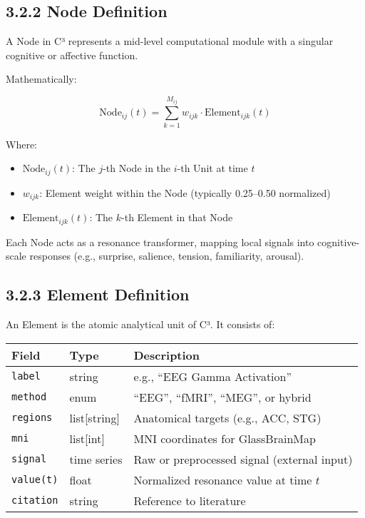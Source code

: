 \documentclass[10pt]{article}
\begin{document}
\subsection*{3.2.2 Node Definition}

A Node in C³ represents a mid-level computational module with a singular cognitive or affective function.

Mathematically:

\[
\text{Node}_{ij}(t) = \sum_{k=1}^{M_{ij}} w_{ijk} \cdot \text{Element}_{ijk}(t)
\]

Where:

\begin{itemize}
    \item $\text{Node}_{ij}(t)$: The $j$-th Node in the $i$-th Unit at time $t$
    \item $w_{ijk}$: Element weight within the Node (typically 0.25–0.50 normalized)
    \item $\text{Element}_{ijk}(t)$: The $k$-th Element in that Node
\end{itemize}

Each Node acts as a resonance transformer, mapping local signals into cognitive-scale responses (e.g., surprise, salience, tension, familiarity, arousal).

\subsection*{3.2.3 Element Definition}

An Element is the atomic analytical unit of C³. It consists of:

\begin{center}
\begin{tabular}{|l|l|p{8cm}|}
\hline
\textbf{Field} & \textbf{Type} & \textbf{Description} \\
\hline
\texttt{label} & string & e.g., ``EEG Gamma Activation'' \\
\texttt{method} & enum & ``EEG'', ``fMRI'', ``MEG'', or hybrid \\
\texttt{regions} & list[string] & Anatomical targets (e.g., ACC, STG) \\
\texttt{mni} & list[int] & MNI coordinates for GlassBrainMap \\
\texttt{signal} & time series & Raw or preprocessed signal (external input) \\
\texttt{value(t)} & float & Normalized resonance value at time $t$ \\
\texttt{citation} & string & Reference to literature \\
\hline
\end{tabular}
\end{center}
\end{document}
